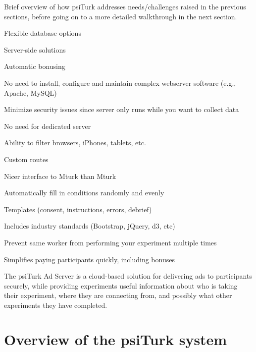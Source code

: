 \documentclass[jou,apacite]{apa6}
\begin{document}
Brief overview of how psiTurk addresses needs/challenges raised in the previous sections, before going on to a more detailed walkthrough in the next section.

Flexible database options

Server-side solutions

Automatic bonusing

No need to install, configure and maintain complex webserver software (e.g., Apache, MySQL)

Minimize security issues since server only runs while you want to collect data

No need for dedicated server

Ability to filter browsers, iPhones, tablets, etc. 

Custom routes

Nicer interface to Mturk than Mturk 

Automatically fill in conditions randomly and evenly

Templates (consent, instructions, errors, debrief)

Includes industry standards (Bootstrap, jQuery, d3, etc) 

Prevent same worker from performing your experiment multiple times

Simplifies paying participants quickly, including bonuses

The psiTurk Ad Server is a cloud-based solution for delivering ads to participants securely, while providing experiments useful information about who is taking their experiment, where they are connecting from, and possibly what other experiments they have completed.





\section{Overview of the psiTurk system}
\end{document}
